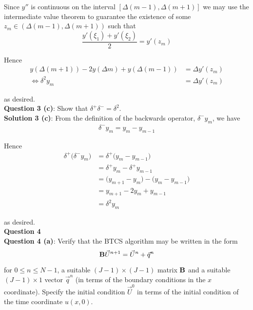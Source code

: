 \documentclass[12pt]{article}
\newlength\tindent
\renewcommand{\indent}{\hspace*{\tindent}}
\begin{document}
\indent Since $y''$ is continuous on the interval $[\Delta(m - 1), \Delta(m + 1)]$ we may use the intermediate value theorem to guarantee the existence of some $z_m \in (\Delta(m - 1), \Delta(m + 1))$ such that
\begin{equation*}
	\frac{y'(\xi_1) + y'(\xi_2)}{2} = y'(z_m)
\end{equation*}

Hence
\begin{align*}
	y(\Delta(m + 1)) - 2y(\Delta m) + y(\Delta(m - 1)) &=  \Delta y'(z_m) \\
	\iff \delta^2 y_m &= \Delta y'(z_m)
\end{align*}

as desired. \\


{\bf Question 3 (c)}: Show that $\delta^+\delta^- = \delta^2$. \\

{\bf Solution 3 (c)}: From the definition of the backwards operator, $\delta^-y_m$, we have
\begin{align*}
	\delta^-y_m = y_m - y_{m - 1}
\end{align*}

Hence
\begin{align*}
	\delta^+ \big( \delta^-y_m \big) &= 	\delta^+ \big( y_m - y_{m - 1} \big) \\
	&= \delta^+ y_m - \delta^+ y_{m - 1} \\
	&= \big( y_{m + 1} - y_m \big) - \big( y_{m} - y_{m - 1} \big) \\
	&= y_{m + 1} - 2y_m + y_{m - 1} \\
	&= \delta^2y_m
\end{align*}

as desired. \\


\newpage
{\bf\large Question 4} \\

{\bf Question 4 (a)}: Verify that the BTCS algorithm may be written in the form
\begin{equation*}
	{\bf B}\vec{U}^{n + 1} = \vec{U}^n + \vec{q}^n
\end{equation*}

for $0 \leq n \leq N - 1$, a suitable $(J - 1) \times (J - 1)$ matrix ${\bf B}$ and a suitable $(J - 1) \times 1$ vector $\vec{q}^n$ (in terms of the boundary conditions in the $x$ coordinate). Specify the initial condition $\vec{U}^0$ in terms of the initial condition of the time coordinate $u(x,0)$. \\
\end{document}
